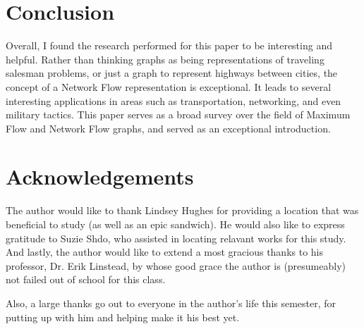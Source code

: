 \documentclass[conference]{IEEEtran}
\begin{document}
\section{Conclusion}
Overall, I found the research performed for this paper to be interesting and helpful. Rather than thinking graphs as being representations of traveling salesman problems, or just a graph to represent highways between cities, the concept of a Network Flow representation is exceptional. It leads to several interesting applications in areas such as transportation, networking, and even military tactics. This paper serves as a broad survey over the field of Maximum Flow and Network Flow graphs, and served as an exceptional introduction.

\section*{Acknowledgements}
The author would like to thank Lindsey Hughes for providing a location that was beneficial to study (as well as an epic sandwich). He would also like to express gratitude to Suzie Shdo, who assisted in locating relavant works for this study. And lastly, the author would like to extend a most gracious thanks to his professor, Dr. Erik Linstead, by whose good grace the author is (presumeably) not failed out of school for this class.

Also, a large thanks go out to everyone in the author's life this semester, for putting up with him and helping make it his best yet.



%
%
\end{document}
